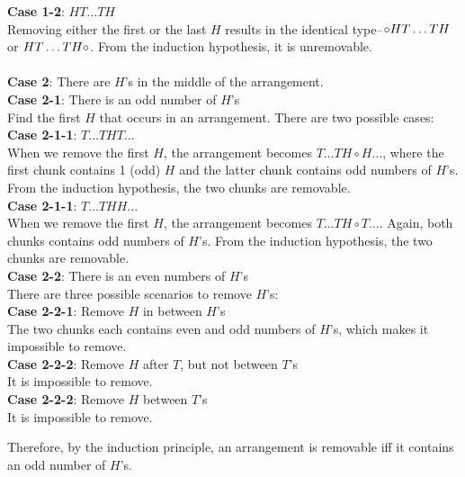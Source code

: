 \documentclass[../main.tex]{subfiles}
\begin{document}
\begin{sol}
    \noindent \textbf{Case 1-2}: $HT\dots TH$\\
    \indent Removing either the first or the last $H$ results in the identical type--$\circ HT\-\dots\-TH$ or $HT\-\dots\-TH\circ$.
    From the induction hypothesis, it is unremovable.
    \\
    \\
    \noindent \textbf{Case 2}: There are $H$'s in the middle of the arrangement.\\
    \noindent \textbf{Case 2-1}: There is an odd number of $H$'s\\
    \indent Find the first $H$ that occurs in an arrangement.
    There are two possible cases:\\
    \noindent \textbf{Case 2-1-1}: $T\dots THT\dots$\\
    \indent When we remove the first $H$, the arrangement becomes $T\dots T H \circ H \dots$, where the first chunk contains 1 (odd) $H$ and the latter chunk contains odd numbers of $H$'s.
    From the induction hypothesis, the two chunks are removable.\\
    \noindent \textbf{Case 2-1-1}: $T\dots THH\dots$\\
    \indent When we remove the first $H$, the arrangement becomes $T \dots TH \circ T \dots$.
    Again, both chunks contains odd numbers of $H$'s.
    From the induction hypothesis, the two chunks are removable.\\

    \noindent \textbf{Case 2-2}: There is an even numbers of $H$'s\\
    \indent There are three possible scenarios to remove $H$'s:\\
    \noindent \textbf{Case 2-2-1}: Remove $H$ in between $H$'s\\
    \indent The two chunks each contains even and odd numbers of $H$'s, which makes it impossible to remove.\\
    \noindent \textbf{Case 2-2-2}: Remove $H$ after $T$, but not between $T$'s\\
    \indent It is impossible to remove.\\
    \noindent \textbf{Case 2-2-2}: Remove $H$ between $T$'s\\
    \indent It is impossible to remove.

    Therefore, by the induction principle, an arrangement is removable iff it contains an odd number of $H$'s.
\end{sol}
\end{document}
